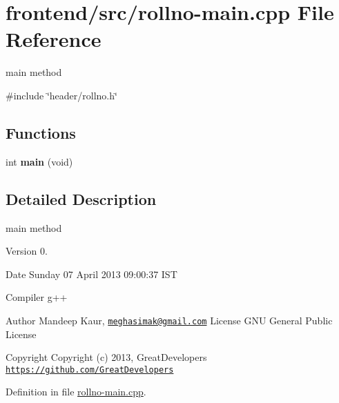 \hypertarget{rollno-main_8cpp}{\section{frontend/src/rollno-\/main.cpp \-File \-Reference}
\label{d2/d6f/rollno-main_8cpp}
}


main method  


{\ttfamily \#include \char`\"{}header/rollno.\-h\char`\"{}}\*
\subsection*{\-Functions}
\begin{DoxyCompactItemize}
\item 
\hypertarget{rollno-main_8cpp_a840291bc02cba5474a4cb46a9b9566fe}{int {\bfseries main} (void)}\label{d2/d6f/rollno-main_8cpp_a840291bc02cba5474a4cb46a9b9566fe}

\end{DoxyCompactItemize}


\subsection{\-Detailed \-Description}
main method \begin{DoxyVersion}{\-Version}
0. 
\end{DoxyVersion}
\begin{DoxyDate}{\-Date}
\-Sunday 07 \-April 2013 09\-:00\-:37 \-I\-S\-T\par
 \-Compiler g++
\end{DoxyDate}
\begin{DoxyAuthor}{\-Author}
\-Mandeep \-Kaur, \href{mailto:meghasimak@gmail.com}{\tt meghasimak@gmail.\-com} \-License \-G\-N\-U \-General \-Public \-License 
\end{DoxyAuthor}
\begin{DoxyCopyright}{\-Copyright}
\-Copyright (c) 2013, \-Great\-Developers \href{https://github.com/GreatDevelopers}{\tt https\-://github.\-com/\-Great\-Developers} 
\end{DoxyCopyright}


\-Definition in file \hyperlink{rollno-main_8cpp_source}{rollno-\/main.\-cpp}.

